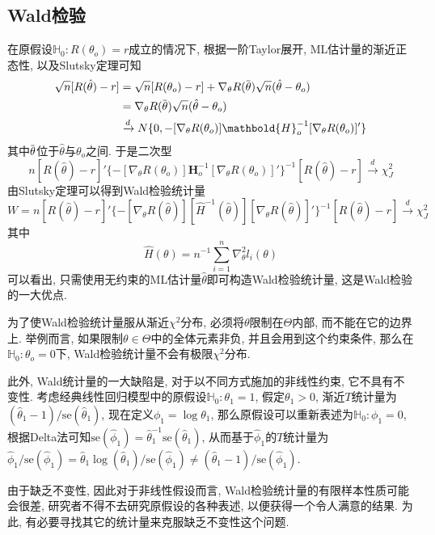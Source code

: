 \documentclass[cn, 12pt, math=mtpro2, bibstyle=apa, blue, twocol]{elegantbook}
\newcommand{\HH}{\mathbb{H}}
\newcommand{\hth}{\hat{\theta}}
\newcommand{\overbar}[1]{\mkern 1.5mu\overline{\mkern-1.5mu#1\mkern-1.5mu}\mkern 1.5mu}
\begin{document}
\subsection{Wald检验}
在原假设$\HH_0: R(\theta_o)=r$成立的情况下, 根据一阶Taylor展开, ML估计量的渐近正态性, 以及Slutsky定理可知
\begin{align*}
\sqrt{n}[R(\hat{\theta})-r]&=\sqrt{n}[R(\theta_o)-r]+\nabla_\theta R(\overbar{\theta})\sqrt{n}(\hat{\theta}-\theta_o) \\
&=\nabla_\theta R(\overbar{\theta})\sqrt{n}(\hat{\theta}-\theta_o) \\
&\xrightarrow{d} N\{0,-[\nabla_\theta R(\theta_o)]\mathbold{H}_o^{-1}[\nabla_\theta R(\theta_o)]'\}
\end{align*}
其中$\overbar{\theta}$位于$\hat{\theta}$与$\theta_o$之间. 于是二次型
$$n[R(\hth)-r]'\{-[\nabla_\theta R(\theta_o)]\mathbold{H}_o^{-1}[\nabla_\theta R(\theta_o)]'\}^{-1}[R(\hth)-r]\xrightarrow{d}\chi^2_J$$
由Slutsky定理可以得到Wald检验统计量
$$W=n[R(\hth)-r]'\{-[\nabla_\theta R(\hth)][\hat{H}^{-1}(\hth)][\nabla_\theta R(\hth)]'\}^{-1}[R(\hth)-r]\xrightarrow{d}\chi^2_J$$
其中
$$\hat{H}(\theta)=n^{-1}\sum_{i=1}^{n}\nabla_\theta^2 l_i(\theta)$$
可以看出, 只需使用无约束的ML估计量$\hth$即可构造Wald检验统计量, 这是Wald检验的一大优点.

为了使Wald检验统计量服从渐近$\chi^2$分布, 必须将$\theta$限制在$\Theta$内部, 而不能在它的边界上. 举例而言, 如果限制$\theta\in\Theta$中的全体元素非负, 并且会用到这个约束条件, 那么在$\HH_0: \theta_o=0$下, Wald检验统计量不会有极限$\chi^2$分布.

此外, Wald统计量的一大缺陷是, 对于以不同方式施加的非线性约束, 它不具有不变性. 考虑经典线性回归模型中的原假设$\HH_0: \theta_1=1$, 假定$\theta_1>0$, 渐近$T$统计量为$(\hat{\theta}_1-1)/\text{se}(\hth_1)$, 现在定义$\phi_1=\log\theta_1$, 那么原假设可以重新表述为$\HH_0:\phi_1=0$, 根据Delta法可知$\text{se}(\hat{\phi}_1)=\hat{\theta}_1^{-1}\text{se}(\hth_1)$, 从而基于$\hat{\phi}_1$的$T$统计量为$\hat{\phi}_1/\text{se}(\hat{\phi}_1)=\hth_1\log(\hth_1)/\text{se}(\hat{\phi}_1)\neq (\hth_1-1)/\text{se}(\hat{\phi}_1)$.

由于缺乏不变性, 因此对于非线性假设而言, Wald检验统计量的有限样本性质可能会很差, 研究者不得不去研究原假设的各种表述, 以便获得一个令人满意的结果. 为此, 有必要寻找其它的统计量来克服缺乏不变性这个问题.
\end{document}
